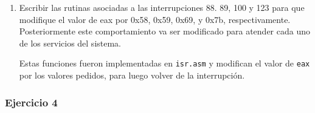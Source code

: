 \documentclass[a4paper]{article}
\begin{document}
\begin{enumerate}[label=\alph*)]
 	\item Escribir las rutinas asociadas a las interrupciones 88. 89, 100 y 123 para que modifique el valor de eax por 0x58, 0x59, 0x69, y 0x7b, respectivamente. Posteriormente este comportamiento va  ser modificado para atender cada uno de los servicios del sistema.
 	
 	Estas funciones fueron implementadas en \texttt{isr.asm} y modifican el valor de \texttt{eax} por los valores pedidos, para luego volver de la interrupción.
 	
 \end{enumerate}
 
 \subsubsection{Ejercicio 4}
 
\end{document}
